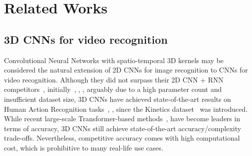 \vspace{-5pt}
\section{Related Works} \label{sec:related-work}
\vspace{-3pt}
\subsection{3D CNNs for video recognition}
\vspace{-3pt}
Convolutional Neural Networks with spatio-temporal 3D kernels may be considered the natural extension of 2D CNNs for image recognition to CNNs for video recognition.
Although they did not surpass their 2D CNN + RNN competitors~\cite{donahue2015longterm}, \cite{yuehei2015beyond} initially~\cite{ji20133dconv}, \cite{karpathy2014largescale}, \cite{tran2015learning}, arguably due to a high parameter count and insufficient dataset size, 3D CNNs have achieved state-of-the-art results on Human Action Recognition tasks~\cite{carreira2017quo}, \cite{tran2018closer}, \cite{feichtenhofer2019slowfast} since the Kinetics dataset~\cite{kay2017kinetics} was introduced.
While recent large-scale Transformer-based methods~\cite{arnab2021vivit}, \cite{neimark2021video} have become leaders in terms of accuracy, 3D CNNs still achieve state-of-the-art accuracy/complexity trade-offs. 
Nevertheless, competitive accuracy comes with high computational cost, which is prohibitive to many real-life use cases.

